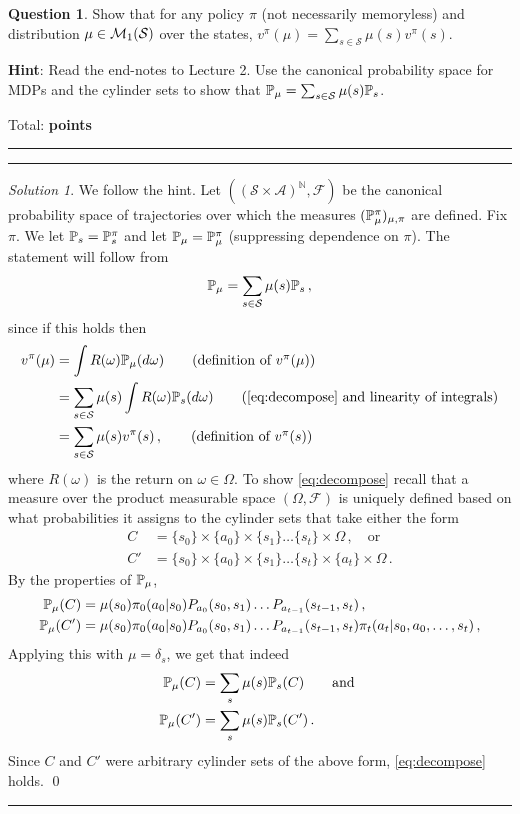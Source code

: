 \documentclass{article}
\DeclareMathOperator*{\1}{\mathbbm{1}}
\newcommand{\NN}{\mathbb{N}}
\newcommand{\cF}{\mathcal{F}}
\newcounter{DocPoints} %
\newcounter{QuestionPoints} %
\newcommand{\tpoints}[1]{        %
	\ifthenelse{\isempty{#1}}%
	{%
	}%
	{%
		\addtocounter{DocPoints}{#1}
		\addtocounter{QuestionPoints}{#1}
	}													 %
	\par\mbox{}\par\noindent\hfill {Total: \bf \arabic{QuestionPoints}\xspace points}\par\mbox{}\par\hrule\hrule
	\setcounter{QuestionPoints}{0}
}
\theoremstyle{definition}
\newtheorem{question}{Question}
\theoremstyle{remark}
\newtheorem*{solution*}{Solution}
\newcommand{\hint}{\noindent \textbf{Hint}:\xspace}
\newcommand{\cS}{\mathcal{S}}
\newcommand{\cA}{\mathcal{A}}
\begin{document}
\begin{question}
Show that for any policy $\pi$ (not necessarily memoryless) and distribution $\mu\in \cM_1(\cS)$ over the states,
 $v^\pi(\mu) = \sum_{s\in \cS} \mu(s) v^{\pi}(s)$.
 
\hint Read the end-notes to Lecture 2. Use the canonical probability space for MDPs and the cylinder sets to show that $\PP_\mu = \sum_{s\in \cS} \mu(s) \PP_s$.
\tpoints{10}
\end{question}
\begin{solution*}
We follow the hint.
Let $((\cS\times\cA )^{\NN},\cF)$ be the canonical probability space
of trajectories
over which the measures $(\mathbb{P}_\mu^\pi)_{\mu,\pi}$ are defined. 
Fix $\pi$.
We let $\mathbb{P}_s = \mathbb{P}_s^\pi$ and let $\mathbb{P}_\mu = \mathbb{P}_\mu^\pi$ (suppressing dependence on $\pi$).
The statement will follow from 
\begin{align}
\PP_\mu= \sum_{s\in \cS} \mu(s) \PP_s\,,
\label{eq:decompose}
\end{align}
since if this holds then
\begin{align*}
v^\pi(\mu) 
& = \int R(\omega) \PP_\mu(d\omega)  \tag{\text{definition of $v^\pi(\mu)$}} \\
& = \sum_{s\in \cS} \mu(s) \int R(\omega) \PP_s(d\omega)  \tag{\text{\cref{eq:decompose} and linearity of integrals}}\\
& = \sum_{s\in \cS} \mu(s) v^\pi(s)\,,
\tag{\text{definition of $v^\pi(s)$}}
\end{align*}
where $R(\omega)$ is the return on $\omega\in \Omega$.
To show \cref{eq:decompose} recall that a measure over the product measurable space $(\Omega,\cF)$ is uniquely defined based on what probabilities it assigns to the cylinder sets that take either the form 
\begin{align*}
C   & = \{ s_0 \} \times \{ a_0 \} \times \{ s_1 \} \dots \{ s_t \} \times \Omega\,, \quad \text{or}\\
C' & = \{ s_0 \} \times \{ a_0 \} \times  \{ s_1 \} \dots \{ s_t \} \times \{a_t\}\times \Omega\,.
\end{align*}
By the properties of $\mathbb{P}_\mu$, 
\begin{align*}
\mathbb{P}_\mu(C) &= \mu(s_0) \pi_0(a_0|s_0) P_{a_0}(s_0,s_1) \dots P_{a_{t-1}}(s_{t-1},s_t)\,,\\
\mathbb{P}_\mu(C') &= \mu(s_0) \pi_0(a_0|s_0) P_{a_0}(s_0,s_1) \dots P_{a_{t-1}}(s_{t-1},s_t)
\pi_t(a_t|s_0,a_0,\dots,s_t)
\,,
\end{align*}
Applying this with $\mu = \delta_s$, we get that indeed
\begin{align*}
\mathbb{P}_\mu(C) &= \sum_s \mu(s) \mathbb{P}_s(C) \qquad \text{and }\\
\mathbb{P}_\mu(C') &= \sum_s \mu(s) \mathbb{P}_s(C') \,.
\end{align*}
Since $C$ and $C'$ were arbitrary cylinder sets of the above form, \cref{eq:decompose} holds.
\qed\par\smallskip\hrule
\end{solution*}
\end{document}
